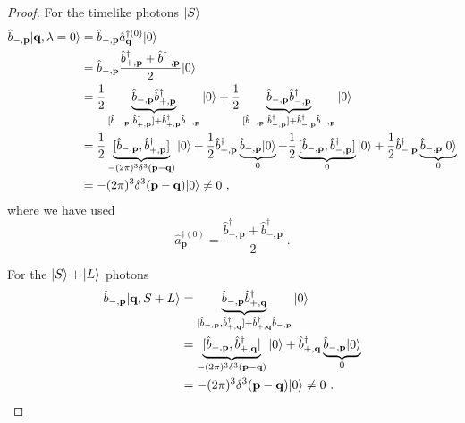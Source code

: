 \begin{proof}
        For the timelike photons $\vert S\rangle$
        \begin{equation*}
        \begin{aligned}
            \hat b_{-, \mathbf p} \vert\mathbf q, \lambda=0\rangle & = \hat b_{-, \mathbf p} \hat a_{\mathbf q}^{\dagger (0)} \vert0\rangle \\ & = \hat b_{-, \mathbf p} \frac{\hat b^\dagger_{+, \mathbf p} + \hat b^\dagger_{-, \mathbf p}}{2} \vert0\rangle \\ &  = \frac{1}{2} \underbrace{\hat b_{-, \mathbf p} \hat b^\dagger_{+, \mathbf p}}_{[\hat b_{-, \mathbf p} ,\hat b^\dagger_{+, \mathbf p}] + \hat b^\dagger_{+, \mathbf p} \hat b_{-, \mathbf p} } \vert0\rangle + \frac{1}{2} \underbrace{\hat b_{-, \mathbf p} \hat b^\dagger_{-, \mathbf p}}_{[\hat b_{-, \mathbf p}, \hat b^\dagger_{-, \mathbf p}] + \hat b^\dagger_{-, \mathbf p} \hat b_{-, \mathbf p}} \vert0\rangle \\ & = \frac{1}{2} \underbrace{[\hat b_{-, \mathbf p} ,\hat b^\dagger_{+, \mathbf p}]}_{- (2\pi)^3 \delta^3 (\mathbf p - \mathbf q)} \vert0\rangle + \frac{1}{2} \hat b^\dagger_{+, \mathbf p} \underbrace{\hat b_{-, \mathbf p} \vert0\rangle}_0 + \frac{1}{2} \underbrace{[\hat b_{-, \mathbf p}, \hat b^\dagger_{-, \mathbf p}]}_{0} \vert0\rangle + \frac{1}{2} \hat b^\dagger_{-, \mathbf p} \underbrace{\hat b_{-, \mathbf p} \vert0\rangle}_0 \\ & = - (2\pi)^3 \delta^3 (\mathbf p - \mathbf q) \vert0\rangle \neq 0 ~,
        \end{aligned}
        \end{equation*}
        where we have used 
        \begin{equation*}
            \hat a^{\dagger (0)}_{\mathbf p} = \frac{\hat b^\dagger_{+, \mathbf p} + \hat b^\dagger_{-, \mathbf p}}{2} ~.
        \end{equation*}

        For the $\vert S\rangle + \vert L\rangle$ photons
        \begin{equation*}
        \begin{aligned}
            \hat b_{-, \mathbf p} \vert\mathbf q, S + L\rangle & = \underbrace{\hat b_{-, \mathbf p} \hat b_{+,\mathbf q}^{\dagger}}_{[\hat b_{-, \mathbf p}, \hat b_{+,\mathbf q}^{\dagger}] + \hat b_{+,\mathbf q}^{\dagger} \hat b_{-, \mathbf p} } \vert0\rangle \\ & = \underbrace{[\hat b_{-, \mathbf p}, \hat b_{+,\mathbf q}^{\dagger}]}_{- (2\pi)^3 \delta^3 (\mathbf p -\mathbf q)} \vert0\rangle + \hat b_{+,\mathbf q}^{\dagger} \underbrace{\hat b_{-, \mathbf p} \vert0\rangle}_0 \\ & = - (2\pi)^3 \delta^3 (\mathbf p -\mathbf q) \vert0\rangle \neq 0 ~.
        \end{aligned}
        \end{equation*}


\end{proof}
